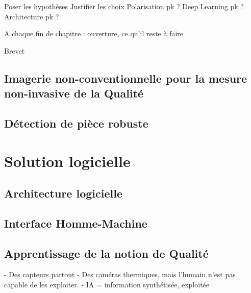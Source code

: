 
Poser les hypothèses
Justifier les choix
Polarisation pk ?
Deep Learning pk ?
Architecture pk ?

A chaque fin de chapitre : ouverture, ce qu'il reste à faire

Brevet \cite{nagorny_dispositif_2019}

\subsection{Imagerie non-conventionnelle pour la mesure non-invasive de la Qualité}
\blindtext

\subsection{Détection de pièce robuste}
\blindtext

\section{Solution logicielle}
\subsection{Architecture logicielle}
\blindtext

\subsection{Interface Homme-Machine}
\blindtext

\subsection{Apprentissage de la notion de Qualité}
- Des capteurs partout
- Des caméras thermiques, mais l'humain n'est pas capable de les exploiter.
- IA = information synthétisée, exploitée



